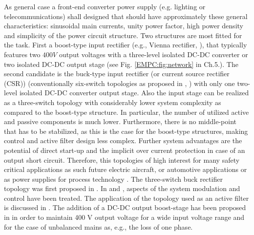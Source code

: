 As  general case a front-end  converter power supply (e.g. lighting or telecommunications) shall designed that should have approximately these general characteristics: sinusoidal main currents, unity power factor, high power density and simplicity of the power circuit structure. Two structures are most fitted for the task. First a boost-type input rectifier (e.g., Vienna rectifier, \cite{kolar1996design}), that typically features two $400V$ output voltages with a three-level isolated  DC-DC  converter  or  two  isolated  DC-DC  output  stage (see Fig. \ref{EMPC:fig:network} in Ch.5.). The second candidate is the buck-type  input  rectifier (or current source rectifier (CSR))  (conventionally  six-switch topologies as proposed in \cite{zargari1993current}, \cite{sato1993state}) with only one two-level isolated  DC-DC  converter  output  stage.  Also the  input  stage  can be realized as a three-switch topology with considerably  lower  system  complexity  as  compared  to  the boost-type structure. In particular, the number of utilized active and passive components is much lower. Furthermore, there is no middle-point that has to be stabilized, as this is the case for the boost-type structures, making control and active filter design less complex. Further system advantages are the potential of direct start-up and the implicit over current protection in case of an output short circuit. Therefore, this topologies of high interest for many safety critical applications as such future electric aircraft, or automotive applications or as power supplies for process technology \cite{nussbaumer2007comprehensive}.
The three-switch buck rectifier topology was first proposed in \cite{malesani1987three}. In \cite{itoh1989steady} and \cite{tooth2000effects}, aspects of the system modulation and control have been treated. The application of the topology used as an active filter is discussed in \cite{salo2005three}.  The addition of a DC-DC output boost-stage has been proposed in \cite{baumannnew} in order to maintain 400 V output voltage for a wide input voltage range and for the case of unbalanced mains as, e.g., the loss of one phase.

\label{BASICCSR:sec:OperationPrinciple}

